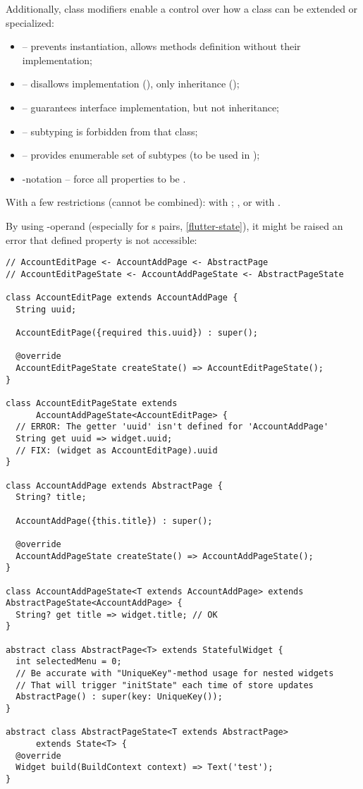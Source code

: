 \noindent Additionally, class modifiers enable a control over how a class can be extended or specialized:

\begin{itemize}
  \item {} -- prevents instantiation, allows methods definition without their implementation;
  \item {} -- disallows implementation (), only inheritance ();
  \item {} -- guarantees interface implementation, but not inheritance;
  \item {} -- subtyping is forbidden from that class;
  \item {} -- provides enumerable set of subtypes (to be used in );
  \item {}-notation -- force all properties to be .
\end{itemize}

\noindent With a few restrictions (cannot be combined):  with ; ,  or 
 with .

\noindent By using -operand (especially for s pairs, \ref{flutter-state}), it might be 
raised an error that defined property is not accessible:

\begin{lstlisting}
// AccountEditPage <- AccountAddPage <- AbstractPage
// AccountEditPageState <- AccountAddPageState <- AbstractPageState

class AccountEditPage extends AccountAddPage {
  String uuid;

  AccountEditPage({required this.uuid}) : super();

  @override
  AccountEditPageState createState() => AccountEditPageState();
}

class AccountEditPageState extends 
      AccountAddPageState<AccountEditPage> {
  // ERROR: The getter 'uuid' isn't defined for 'AccountAddPage'
  String get uuid => widget.uuid; 
  // FIX: (widget as AccountEditPage).uuid
}

class AccountAddPage extends AbstractPage {
  String? title;

  AccountAddPage({this.title}) : super();

  @override
  AccountAddPageState createState() => AccountAddPageState();
}

class AccountAddPageState<T extends AccountAddPage> extends AbstractPageState<AccountAddPage> {
  String? get title => widget.title; // OK
}

abstract class AbstractPage<T> extends StatefulWidget {
  int selectedMenu = 0;
  // Be accurate with "UniqueKey"-method usage for nested widgets
  // That will trigger "initState" each time of store updates 
  AbstractPage() : super(key: UniqueKey());
}

abstract class AbstractPageState<T extends AbstractPage> 
      extends State<T> {
  @override
  Widget build(BuildContext context) => Text('test');
}
\end{lstlisting}


